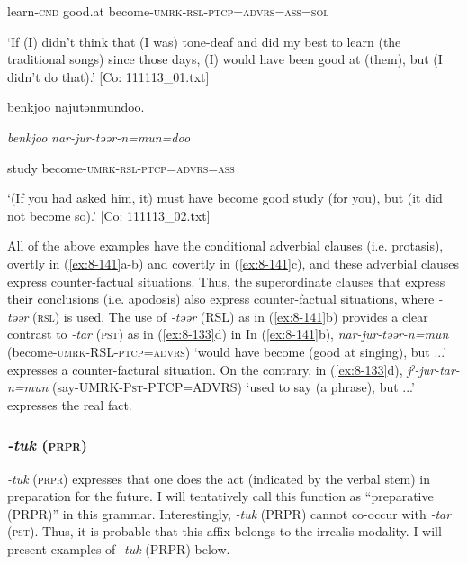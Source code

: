       learn-\textsc{cnd}    good.at  become-\textsc{umrk}-\textsc{rsl}-\textsc{ptcp}=\textsc{advrs}=\textsc{ass}=\textsc{sol}

\glt ‘If (I) didn’t think that (I was) tone-deaf and did my best to learn (the traditional songs) since those days, (I) would have been good at (them), but (I didn’t do that).’ [Co: 111113\_01.txt]

    {\TM}
\glll  {\textbar}benkjoo{\textbar}  najutənmundoo.

      \textit{benkjoo}  \textit{nar-jur-təər{}-n=mun=doo}

      study  become-\textsc{umrk}-\textsc{rsl}-\textsc{ptcp}=\textsc{advrs}=\textsc{ass}

\glt ‘(If you had asked him, it) must have become good study (for you), but (it did not become so).’ [Co: 111113\_02.txt]
\z

All of the above examples have the conditional adverbial clauses (i.e. protasis), overtly in (\ref{ex:8-141}a-b) and covertly in (\ref{ex:8-141}c), and these adverbial clauses express counter-factual situations. Thus, the superordinate clauses that express their conclusions (i.e. apodosis) also express counter-factual situations, where \textit{{}-təər} (\textsc{rsl}) is used. The use of \textit{{}-təər} (RSL) as in (\ref{ex:8-141}b) provides a clear contrast to \textit{{}-tar} (\textsc{pst}) as in (\ref{ex:8-133}d) in  In (\ref{ex:8-141}b), \textit{nar-jur-təər-n=mun} (become-\textsc{umrk}-RSL-\textsc{ptcp}=\textsc{advrs}) ‘would have become (good at singing), but ...’ expresses a counter-factural situation. On the contrary, in (\ref{ex:8-133}d), \textit{jˀ-jur-tar-n=mun} (say-UMRK-P\textsc{st}-PTCP=ADVRS) ‘used to say (a phrase), but ...’ expresses the real fact.

\subsubsection{\textit{{}-tuk} (\textsc{prpr})}

\textit{{}-tuk} (\textsc{prpr}) expresses that one does the act (indicated by the verbal stem) in preparation for the future. I will tentatively call this function as “preparative (PRPR)” in this grammar. Interestingly, \textit{{}-tuk} (PRPR) cannot co-occur with \textit{{}-tar} (\textsc{pst}). Thus, it is probable that this affix belongs to the irrealis modality. I will present examples of \textit{{}-tuk} (PRPR) below.

